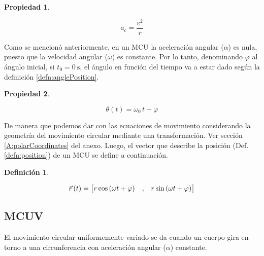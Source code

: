 \documentclass[a5paper,12pt,twoside]{book}
\newtheorem{defn}{{Definición}}[chapter]
\newtheorem{prop}{{Propiedad}}[chapter]
\begin{document}
\begin{mdframed}[style=MyFrame1]
    \begin{prop}
        \label{prop:}
    \end{prop}
    \begin{equation*}
        a_c = \dfrac{v^2}{r}
    \end{equation*}
\end{mdframed}

Como se mencionó anteriormente, en un MCU la aceleración angular ($\alpha$) es nula, puesto que la velocidad angular ($\omega$) es constante. Por lo tanto, denominando $\varphi$ al ángulo inicial, si $t_0=\SI{0}{\second}$, el ángulo en función del tiempo va a estar dado según la definición \ref{defn:anglePosition}.

\begin{mdframed}[style=MyFrame1]
    \begin{prop}
    \end{prop}
    \begin{equation*}
        \theta (t) = \omega_0 \, t + \varphi
    \end{equation*}
\end{mdframed}

De manera que podemos dar con las ecuaciones de movimiento considerando la geometría del movimiento circular mediante una transformación. Ver sección \ref{A:polarCoordinates} del anexo. Luego, el vector que describe la posición (Def. \ref{defn:position}) de un MCU se define a continuación.

\begin{mdframed}[style=MyFrame1]
    \begin{defn}
        \label{defn:MCUmovementEqns}
    \end{defn}
    \begin{equation*}
        \vec{r}\hspace{0.05cm}(t) = { \begin{bmatrix} r \cos{(\omega t + \varphi)} &,& r \sin{(\omega t + \varphi)} \end{bmatrix} }
    \end{equation*}
\end{mdframed}


\subsection{MCUV}

El movimiento circular uniformemente variado se da cuando un cuerpo gira en torno a una circunferencia con aceleración angular ($\alpha$) constante.
\end{document}

